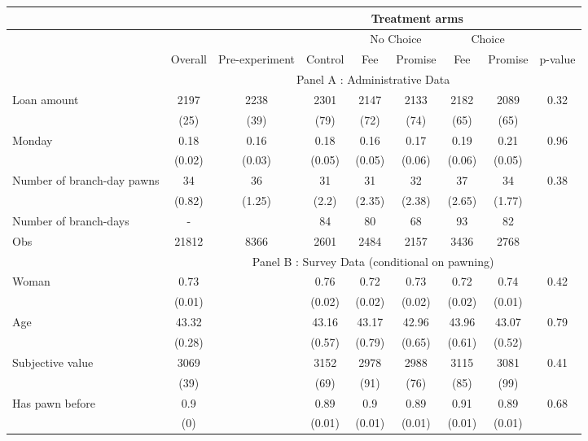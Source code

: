 \begin{tabular}{lcccccccc}
\toprule
      &       &       & \multicolumn{5}{c}{Treatment arms}    &  \\
\midrule
      &       &       &       & \multicolumn{2}{c}{No Choice } & \multicolumn{2}{c}{Choice} &  \\
\midrule
\midrule
      & Overall & Pre-experiment & Control & Fee   & Promise & Fee   & Promise & p-value \\
\midrule
      & \multicolumn{8}{c}{Panel A : Administrative Data} \\
\midrule
\midrule
Loan amount  & 2197  & 2238  & 2301  & 2147  & 2133  & 2182  & 2089  & 0.32 \\
      & (25)  & (39)  & (79)  & (72)  & (74)  & (65)  & (65)  &  \\
Monday & 0.18  & 0.16  & 0.18  & 0.16  & 0.17  & 0.19  & 0.21  & 0.96 \\
      & (0.02) & (0.03) & (0.05) & (0.05) & (0.06) & (0.06) & (0.05) &  \\
Number of branch-day pawns & 34    & 36    & 31    & 31    & 32    & 37    & 34    & 0.38 \\
      & (0.82) & (1.25) & (2.2) & (2.35) & (2.38) & (2.65) & (1.77) &  \\
\midrule
Number of branch-days & -     &       & 84    & 80    & 68    & 93    & 82    &  \\
Obs   & 21812 & 8366  & 2601  & 2484  & 2157  & 3436  & 2768  &  \\
\midrule
      & \multicolumn{8}{c}{Panel B : Survey Data (conditional on pawning)} \\
\midrule
\midrule
Woman & 0.73  &       & 0.76  & 0.72  & 0.73  & 0.72  & 0.74  & 0.42 \\
      & (0.01) &       & (0.02) & (0.02) & (0.02) & (0.02) & (0.01) &  \\
Age   & 43.32 &       & 43.16 & 43.17 & 42.96 & 43.96 & 43.07 & 0.79 \\
      & (0.28) &       & (0.57) & (0.79) & (0.65) & (0.61) & (0.52) &  \\
Subjective value & 3069  &       & 3152  & 2978  & 2988  & 3115  & 3081  & 0.41 \\
      & (39)  &       & (69)  & (91)  & (76)  & (85)  & (99)  &  \\
Has pawn before & 0.9   &       & 0.89  & 0.9   & 0.89  & 0.91  & 0.89  & 0.68 \\
      & (0)   &       & (0.01) & (0.01) & (0.01) & (0.01) & (0.01) &  \\

\end{tabular}
